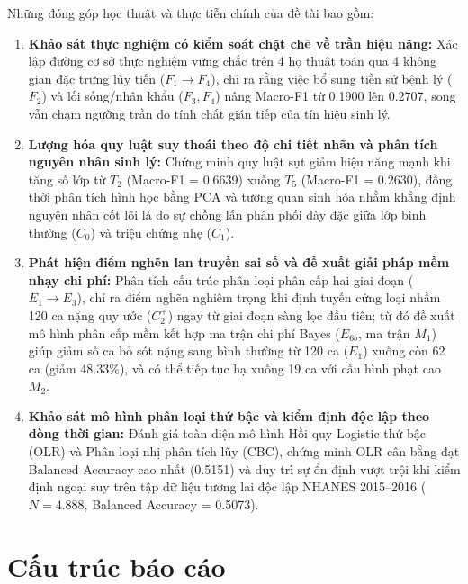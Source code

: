 Những đóng góp học thuật và thực tiễn chính của đề tài bao gồm:
\begin{enumerate}
    \item \textbf{Khảo sát thực nghiệm có kiểm soát chặt chẽ về trần hiệu năng:} Xác lập đường cơ sở thực nghiệm vững chắc trên 4 họ thuật toán qua 4 không gian đặc trưng lũy tiến ($F_1 \to F_4$), chỉ ra rằng việc bổ sung tiền sử bệnh lý ($F_2$) và lối sống/nhân khẩu ($F_3, F_4$) nâng Macro-F1 từ 0.1900 lên 0.2707, song vẫn chạm ngưỡng trần do tính chất gián tiếp của tín hiệu sinh lý.
    \item \textbf{Lượng hóa quy luật suy thoái theo độ chi tiết nhãn và phân tích nguyên nhân sinh lý:} Chứng minh quy luật sụt giảm hiệu năng mạnh khi tăng số lớp từ $T_2$ (Macro-F1 = 0.6639) xuống $T_5$ (Macro-F1 = 0.2630), đồng thời phân tích hình học bằng PCA và tương quan sinh hóa nhằm khẳng định nguyên nhân cốt lõi là do sự chồng lấn phân phối dày đặc giữa lớp bình thường ($C_0$) và triệu chứng nhẹ ($C_1$).
    \item \textbf{Phát hiện điểm nghẽn lan truyền sai số và đề xuất giải pháp mềm nhạy chi phí:} Phân tích cấu trúc phân loại phân cấp hai giai đoạn ($E_1 \to E_3$), chỉ ra điểm nghẽn nghiêm trọng khi định tuyến cứng loại nhầm 120 ca nặng quy ước ($C_2^+$) ngay từ giai đoạn sàng lọc đầu tiên; từ đó đề xuất mô hình phân cấp mềm kết hợp ma trận chi phí Bayes ($E_{6b}$, ma trận $M_1$) giúp giảm số ca bỏ sót nặng sang bình thường từ 120 ca ($E_1$) xuống còn 62 ca (giảm 48.33\%), và có thể tiếp tục hạ xuống 19 ca với cấu hình phạt cao $M_2$.
    \item \textbf{Khảo sát mô hình phân loại thứ bậc và kiểm định độc lập theo dòng thời gian:} Đánh giá toàn diện mô hình Hồi quy Logistic thứ bậc (OLR) và Phân loại nhị phân tích lũy (CBC), chứng minh OLR cân bằng đạt Balanced Accuracy cao nhất (0.5151) và duy trì sự ổn định vượt trội khi kiểm định ngoại suy trên tập dữ liệu tương lai độc lập NHANES 2015--2016 ($N = 4.888$, Balanced Accuracy = 0.5073).
\end{enumerate}

\section{Cấu trúc báo cáo}
\label{sec:bo-cuc-khoa-luan}

